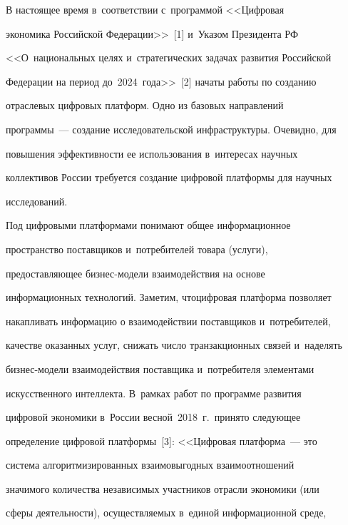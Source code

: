 \vspace*{-3pt}





     В настоящее время в~соответствии с~программой <<Цифровая 


экономика Российской Федерации>>~[1] и~Указом Президента РФ 


<<О~национальных целях и~стратегических задачах развития Российской 


Федерации на период до~2024~года>>~[2] начаты работы по созданию 


отраслевых цифровых платформ. Одно из базовых направлений  


программы~--- создание исследовательской инфраструктуры. Очевидно, для 


повышения эффективности ее использования в~интересах научных 


коллективов России требуется создание цифровой платформы для научных 


исследований. 


     


     Под цифровыми платформами понимают общее информационное 


пространство поставщиков и~потребителей товара (услуги), 


предоставляющее биз\-нес-мо\-дели взаимодействия на основе  


информационных тех\-но\-ло\-гий. Заметим, что\linebreak циф\-ровая платформа позволяет 


накапливать информацию о взаимодействии поставщиков и~потребителей, 


качестве оказанных услуг, снижать число транзакционных связей и~наделять 


биз\-нес-мо\-де\-ли взаимодействия поставщика и~потребителя элементами 


искусственного интеллекта. В~рамках работ по программе развития 


цифровой экономики в~России весной~2018~г.\ принято следующее 


определение цифровой платформы~[3]: <<Цифровая платформа~--- это 


система алгоритмизированных взаимовыгодных взаимоотношений 


значимого количества независимых участников отрасли экономики (или 


сферы деятельности), осуществляемых в~единой информационной среде, 


